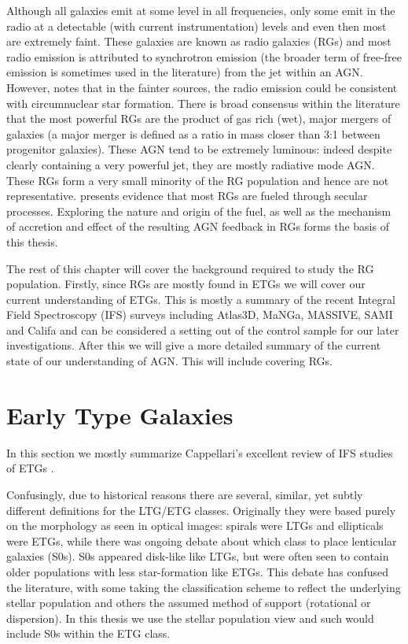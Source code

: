 {{Although all galaxies emit at some level in all frequencies, only some emit in the radio at a detectable (with current instrumentation) levels and even then most are extremely faint. These galaxies are known as radio galaxies (RGs) and most radio emission is attributed to synchrotron emission (the broader term of free-free emission is sometimes used in the literature) from the jet within an AGN. However, \citet{Nyland2016} notes that in the fainter sources, the radio emission could be consistent with circumnuclear star formation. There is broad consensus within the literature that the most powerful RGs are the product of gas rich (wet), major mergers of galaxies (a major merger is defined as a ratio in mass closer than 3:1 between progenitor galaxies). These AGN tend to be extremely luminous: indeed despite clearly containing a very powerful jet, they are mostly radiative mode AGN. These RGs form a very small minority of the RG population and hence are not representative. \citet{Heckman2014} presents evidence that most RGs are fueled through secular processes. Exploring the nature and origin of the fuel, as well as the mechanism of accretion and effect of the resulting AGN feedback in RGs forms the basis of this thesis. 

The rest of this chapter will cover the background required to study the RG population. Firstly, since RGs are mostly found in ETGs we will cover our current understanding of ETGs. This is mostly a summary of the recent Integral Field Spectroscopy (IFS) surveys including Atlas3D, MaNGa, MASSIVE, SAMI and Califa and can be considered a setting out of the control sample for our later investigations. After this we will give a more detailed summary of the current state of our understanding of AGN. This will include covering RGs.

\section{Early Type Galaxies}
	\label{sec:introETG}
	In this section we mostly summarize Cappellari's excellent review of IFS studies of ETGs \citep{Cappellari2016}. 

	Confusingly, due to historical reasons there are several, similar, yet subtly different definitions for the LTG/ETG classes. Originally they were based purely on the morphology as seen in optical images: spirals were LTGs and ellipticals were ETGs, while there was ongoing debate about which class to place lenticular galaxies (S0s). S0s appeared disk-like like LTGs, but were often seen to contain older populations with less star-formation like ETGs. This debate has confused the literature, with some taking the classification scheme to reflect the underlying stellar population and others the assumed method of support (rotational or dispersion). In this thesis we use the stellar population view and such would include S0s within the ETG class.

}}
